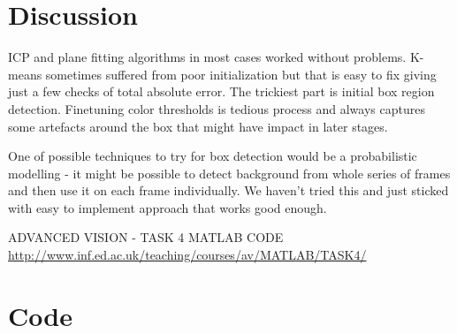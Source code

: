 \documentclass{article}
\begin{document}
\section{Discussion}
ICP and plane fitting algorithms in most cases 
worked without problems. K-means sometimes suffered
from poor initialization but that is easy to 
fix giving just a few checks of total
absolute error. The trickiest part is initial box
region detection. Finetuning color thresholds is tedious
process and always captures some artefacts around the box
that might have impact in later stages.

One of possible techniques to try for box detection
would be a probabilistic modelling - it might be possible
to detect background from whole series of frames
and then use it on each frame individually. 
We haven't tried this and just sticked with
easy to implement approach that works good enough.

\begin{thebibliography}{9}
  
  ADVANCED VISION - TASK 4 MATLAB CODE
  \url{http://www.inf.ed.ac.uk/teaching/courses/av/MATLAB/TASK4/} 
  
\end{thebibliography}

\appendix


\newpage

\newpage
\section{Code}
\label{apen:code_in}

%
\end{document}
